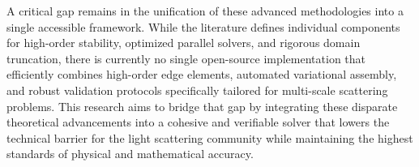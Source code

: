 \documentclass[class=report, crop=false]{standalone}
\begin{document}
A critical gap remains in the unification of these advanced methodologies into a single accessible framework. While the literature defines individual components for high-order stability, optimized parallel solvers, and rigorous domain truncation, there is currently no single open-source implementation that efficiently combines high-order edge elements, automated variational assembly, and robust validation protocols specifically tailored for multi-scale scattering problems. This research aims to bridge that gap by integrating these disparate theoretical advancements into a cohesive and verifiable solver that lowers the technical barrier for the light scattering community while maintaining the highest standards of physical and mathematical accuracy.
\end{document}
